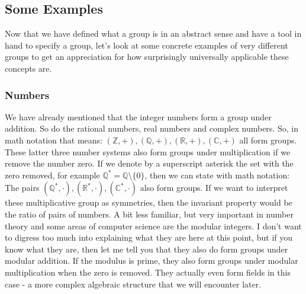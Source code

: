 

\subsection{Some Examples}
Now that we have defined what a group is in an abstract sense and have a tool in hand to specify a group, let's look at some concrete examples of very different groups to get an appreciation for how surprisingly universally applicable these concepts are.

\subsubsection{Numbers}
We have already mentioned that the integer numbers form a group under addition. So do the rational numbers, real numbers and complex numbers. So, in math notation that means:  $(\mathbb{Z}, +), (\mathbb{Q}, +), (\mathbb{R}, +), (\mathbb{C}, +)$ all form groups. These latter three number systems also form groups under multiplication if we remove the number zero. If we denote by a superscript asterisk the set with the zero removed, for example $\mathbb{Q}^{\ast} = \mathbb{Q} \setminus \{0\}$, then we can state with math notation: The pairs $(\mathbb{Q}^{\ast}, \cdot), (\mathbb{R}^{\ast}, \cdot), (\mathbb{C}^{\ast}, \cdot)$ also form groups. If we want to interpret these multiplicative group as symmetries, then the invariant property would be the ratio of pairs of numbers. A bit less familiar, but very important in number theory and some areas of computer science are the modular integers. I don't want to digress too much into explaining what they are here at this point, but if you know what they are, then let me tell you that they also do form groups under modular addition. If the modulus is prime, they also form groups under modular multiplication when the zero is removed. They actually even form fields in this case - a more complex algebraic structure that we will encounter later. %

